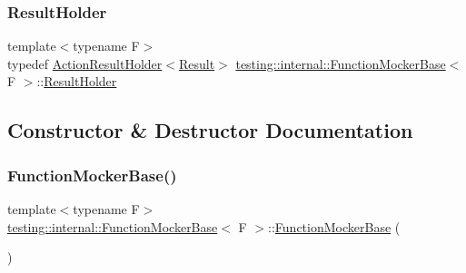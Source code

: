 \subsubsection{\texorpdfstring{Result\+Holder}{ResultHolder}}
{\footnotesize\ttfamily template$<$typename F$>$ \\
typedef \hyperlink{classtesting_1_1internal_1_1_action_result_holder}{Action\+Result\+Holder}$<$\hyperlink{classtesting_1_1internal_1_1_function_mocker_base_aa50abc4055b4d3a14ad64c317bccec8d}{Result}$>$ \hyperlink{classtesting_1_1internal_1_1_function_mocker_base}{testing\+::internal\+::\+Function\+Mocker\+Base}$<$ F $>$\+::\hyperlink{classtesting_1_1internal_1_1_function_mocker_base_aa4e1b2ee217676c9e70c3006b19a8074}{Result\+Holder}\hspace{0.3cm}{\ttfamily [protected]}}



\subsection{Constructor \& Destructor Documentation}
\mbox{\label{classtesting_1_1internal_1_1_function_mocker_base_a2206d80aad533ba6bf1f5e09c909aee0}} 
\subsubsection{\texorpdfstring{Function\+Mocker\+Base()}{FunctionMockerBase()}}
{\footnotesize\ttfamily template$<$typename F$>$ \\
\hyperlink{classtesting_1_1internal_1_1_function_mocker_base}{testing\+::internal\+::\+Function\+Mocker\+Base}$<$ F $>$\+::\hyperlink{classtesting_1_1internal_1_1_function_mocker_base}{Function\+Mocker\+Base} (\begin{DoxyParamCaption}{ }\end{DoxyParamCaption})\hspace{0.3cm}{\ttfamily [inline]}}

\mbox{\label{classtesting_1_1internal_1_1_function_mocker_base_a3c33e7b4aa0e28e5bd46eb072f511068}} 
